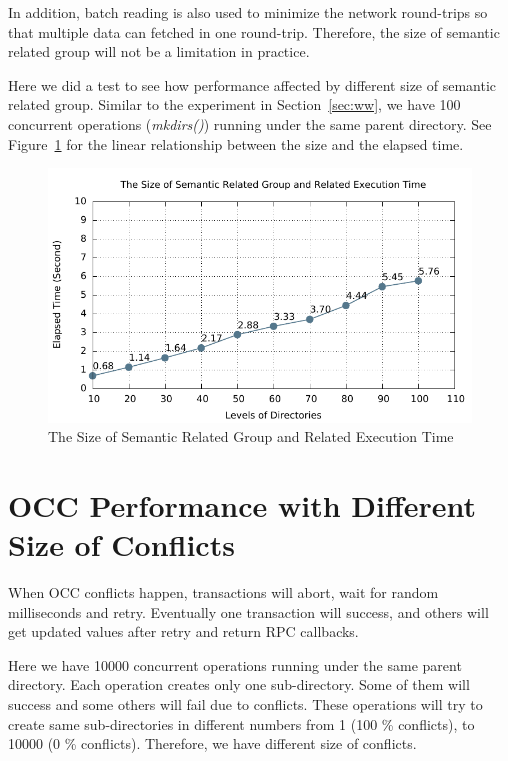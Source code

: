\noindent In addition, batch reading is also used to minimize the network round-trips so that multiple data can fetched in one round-trip. Therefore, the size of semantic related group will not be a limitation in practice. 

\noindent Here we did a test to see how performance affected by different size of semantic related group. Similar to the experiment in Section~\ref{sec:ww}, we have 100 concurrent operations (\textit{mkdirs()}) running under the same parent directory. See Figure~\ref{fig:srg} for the linear relationship between the size and the elapsed time.

\begin{figure}[ht]
	\centering
	\includegraphics[width=\linewidth]{figs/srgSize.pdf}
	\caption{The Size of Semantic Related Group and Related Execution Time}
	\label{fig:srg}
\end{figure}

\section{OCC Performance with Different Size of Conflicts}

When OCC conflicts happen, transactions will abort, wait for random milliseconds and retry. Eventually one transaction will success, and others will get updated values after retry and return RPC callbacks.

\noindent Here we have 10000 concurrent operations running under the same parent directory. Each operation creates only one sub-directory. Some of them will success and some others will fail due to conflicts. These operations will try to create same sub-directories in different numbers from 1 (100 \% conflicts), to 10000 (0 \% conflicts). Therefore, we have different size of conflicts.

